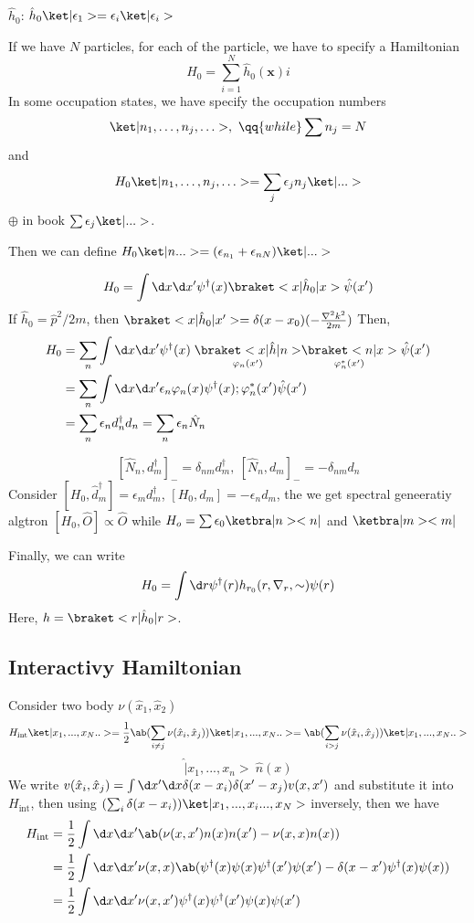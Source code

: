 $\hat h_0$: $\hat h_0\ket|\epsilon_1> = \epsilon_i\ket|\epsilon_i>$

If we have $N$ particles, for each of the particle, we have to specify a Hamiltonian
\[
  H_0 = \sum_{i=1}^N \hat h_0(\bm x)i
\]
In some occupation states, we have specify the occupation numbers
\[\ket|n_1,\ldots,n_j,\ldots>,~ \qq{while} \sum n_j = N\]
and
\[H_0\ket|n_1,\ldots,n_j,\ldots> = \sum_j\epsilon_j n_j\ket|...>\]
$\oplus$ in book $\sum \epsilon_j \ket|...>$.

Then we can define $H_0\ket|n...> = (\epsilon_{n_1} + \epsilon_{nN})\ket|...>$

\[
  H_0 = \int \d x \d x' \psi^\dagger(x)\braket<x|\hat h_0|x>\hat\psi(x')
\]
If $\hat h_0 = \hat p^2/2m$, then $\braket<x|\hat h_0|x'> = \delta(x - x_0)(-\frac{\nabla^2k^2}{2m})$
Then,
\begin{align}
  H_0 & = \sum_n \int \d x\d x'\psi^\dagger(x)\underset{\varphi_n(x')}{\braket<x|\hat h|n>}\underset{\varphi_n^*(x')}{\braket<n|x>}\hat\psi(x')\\
  & = \sum_n \int \d x\d x'\epsilon_n \varphi_n(x)\psi^\dagger(x); \varphi_n^*(x')\hat\psi(x')\\
  & = \sum_n \epsilon_n d_n^\dagger d_n = \sum_n \epsilon_n \hat N_n
\end{align}

\[[\hat N_n, d_m^\dagger]_- = \delta_{nm}d_m^\dagger, ~ [\hat N_n, d_m]_- = -\delta_{nm} d_n\]
Consider $[H_0, \hat d_m^\dagger] = \epsilon_m d_m^\dagger$, $[H_0,d_m] = -\epsilon_n d_m$, the we get spectral geneeratiy algtron $[H_0,\hat O]\propto \hat O$ while $H_o = \sum \epsilon_0 \ketbra|n><n|$ and $\ketbra|m><m|$

Finally, we can write
\[
  H_0 = \int \d r\psi^\dagger(r) h_{r_0}(r,\nabla_r, \sim)\psi(r)
\]
Here, $h = \braket<r|\hat h_0|r>$.

\subsection{Interactivy Hamiltonian}

Consider two body $\nu(\hat x_1, \hat x_2)$
\[
  H_\text{int}\ket|x_1,...,x_N..> = \frac12\ab(\sum_{i\neq j}\nu(\hat x_i,\hat x_j))\ket|x_1,...,x_N..>
  = \ab(\sum_{i>j}\nu(\hat x_i,\hat x_j))\ket|x_1,...,x_N..>
\]
\[\hat|x_1,...,x_n> ~ \hat n(x)\]
We write $v(\hat x_i,\hat x_j) = \int \d x' \d x\delta(x - x_i)\delta(x' - x_j) v(x,x')$ and substitute it into $H_\text{int}$, then using $(\sum_i \delta(x - x_i))\ket|x_1,...,x_i ..., x_N>$ inversely, then we have
\begin{align}
  H_\text{int} & = \frac12 \int \d x \d x'\ab(\nu(x,x')n(x)n(x') - \nu(x,x)n(x))\\
  & = \frac12 \int \d x \d x' \nu(x,x)\ab(\psi^\dagger(x)\psi(x)\psi^\dagger(x')\psi(x') - \delta(x - x')\psi^\dagger(x)\psi(x))\\
  & = \frac12 \int \d x\d x' \nu(x,x')\psi^\dagger(x)\psi^\dagger(x')\psi(x)\psi(x')
\end{align}

